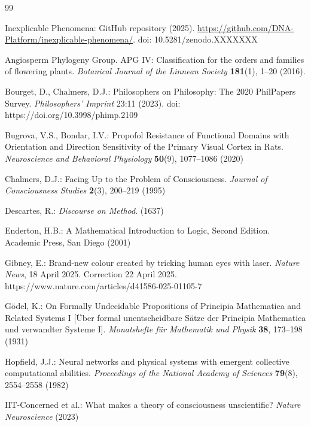 \documentclass[runningheads]{llncs}
\begin{document}
\begin{thebibliography}{99}

Inexplicable Phenomena: GitHub repository (2025). \url{https://github.com/DNA-Platform/inexplicable-phenomena/}. doi: 10.5281/zenodo.XXXXXXX

Angiosperm Phylogeny Group. APG IV: Classification for the orders and families of flowering plants. \textit{Botanical Journal of the Linnean Society} \textbf{181}(1), 1–20 (2016).

Bourget, D., Chalmers, D.J.: Philosophers on Philosophy: The 2020 PhilPapers Survey. \textit{Philosophers' Imprint} 23:11 (2023). doi: https://doi.org/10.3998/phimp.2109

Bugrova, V.S., Bondar, I.V.: Propofol Resistance of Functional Domains with Orientation and Direction Sensitivity of the Primary Visual Cortex in Rats. \textit{Neuroscience and Behavioral Physiology} \textbf{50}(9), 1077--1086 (2020)

Chalmers, D.J.: Facing Up to the Problem of Consciousness. \textit{Journal of Consciousness Studies} \textbf{2}(3), 200--219 (1995)

Descartes, R.: \textit{Discourse on Method}. (1637)

Enderton, H.B.: A Mathematical Introduction to Logic, Second Edition. Academic Press, San Diego (2001)

Gibney, E.: Brand-new colour created by tricking human eyes with laser. \textit{Nature News}, 18 April 2025. Correction 22 April 2025. https://www.nature.com/articles/d41586-025-01105-7

Gödel, K.: On Formally Undecidable Propositions of Principia Mathematica and Related Systems I [Über formal unentscheidbare Sätze der Principia Mathematica und verwandter Systeme I]. \textit{Monatshefte für Mathematik und Physik} \textbf{38}, 173--198 (1931)

Hopfield, J.J.: Neural networks and physical systems with emergent collective computational abilities. \textit{Proceedings of the National Academy of Sciences} \textbf{79}(8), 2554--2558 (1982)

IIT-Concerned et al.: What makes a theory of consciousness unscientific? \textit{Nature Neuroscience} (2023)


\end{thebibliography}
\end{document}
